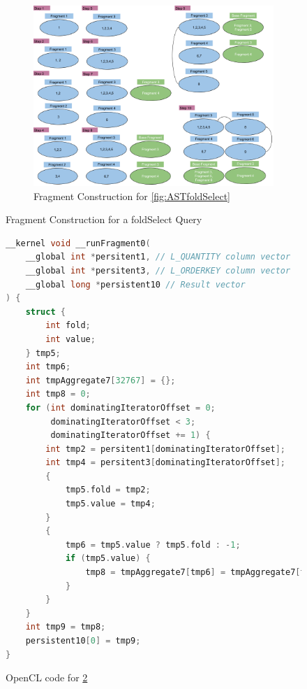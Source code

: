 \begin{figure}
\begin{subfigure}{0.95\textwidth}
  \centering
  \includegraphics[width=1\linewidth]{appendix/FragmentConstructionFoldSelect.png}
  \caption{Fragment Construction for \ref{fig:ASTfoldSelect}}
  \label{fig:fragmentConstructionfoldSelect}
\end{subfigure}
\caption{Fragment Construction for a foldSelect Query}
\label{fig:foldSelectQuery}
\end{figure}

\begin{figure}
\begin{lstlisting}[frame=single, language=C]
__kernel void __runFragment0(
    __global int *persitent1, // L_QUANTITY column vector
    __global int *persitent3, // L_ORDERKEY column vector
    __global long *persistent10 // Result vector
) {
    struct {
        int fold;
        int value;
    } tmp5;
    int tmp6;
    int tmpAggregate7[32767] = {};
    int tmp8 = 0;
    for (int dominatingIteratorOffset = 0; 
         dominatingIteratorOffset < 3; 
         dominatingIteratorOffset += 1) {
        int tmp2 = persitent1[dominatingIteratorOffset];
        int tmp4 = persitent3[dominatingIteratorOffset];
        {
            tmp5.fold = tmp2;
            tmp5.value = tmp4;
        }
        {
            tmp6 = tmp5.value ? tmp5.fold : -1;
            if (tmp5.value) {
                tmp8 = tmpAggregate7[tmp6] = tmpAggregate7[tmp6] + tmp6;
            }
        }
    }
    int tmp9 = tmp8;
    persistent10[0] = tmp9;
}
\end{lstlisting}
    \caption{OpenCL code for \ref{fig:foldSelectQuery}}
    \label{fig:opencl-code}
\end{figure}

